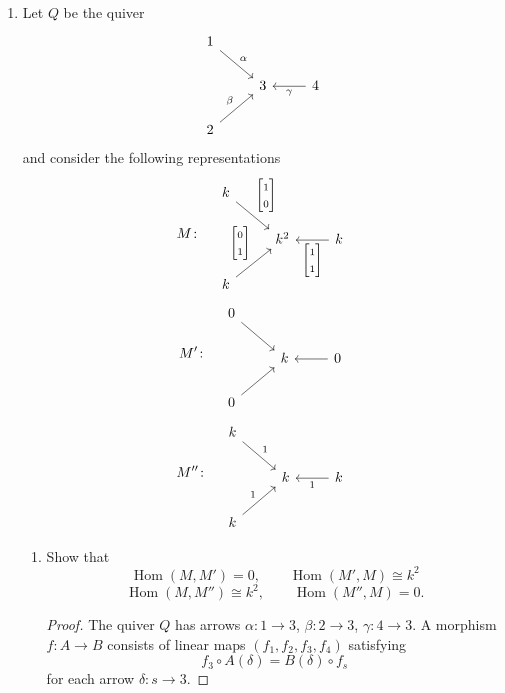 \documentclass[11pt, a4paper]{article}
\begin{document}
\begin{enumerate}[leftmargin=*, label=\textbf{\arabic*.}]
\item Let $Q$ be the quiver
\[
    \begin{tikzcd}
        1 \arrow[rd, "\alpha"] &   &                       \\
                               & 3 & 4 \arrow[l, "\gamma"] \\
        2 \arrow[ru, "\beta"]  &   &                      
        \end{tikzcd}
\]
and consider the following representations
\[
M\colon\quad
\begin{tikzcd}
    k \arrow[rd, "\begin{bmatrix} 1 \\ 0 \end{bmatrix}"] &     &                                                     \\
                                                         & k^2 & k \arrow[l, "\begin{bmatrix} 1 \\ 1 \end{bmatrix}"] \\
    k \arrow[ru, "\begin{bmatrix} 0 \\ 1 \end{bmatrix}"] &     &                                                    
    \end{tikzcd}
\]
\[
M'\colon\quad
\begin{tikzcd}
    0 \arrow[rd] &   &             \\
                 & k & 0 \arrow[l] \\
    0 \arrow[ru] &   &            
    \end{tikzcd}
\]  
\[
M''\colon\quad
\begin{tikzcd}
    k \arrow[rd, "1"] &   &                  \\
                      & k & k \arrow[l, "1"] \\
    k \arrow[ru, "1"] &   &                 
    \end{tikzcd}
\]
\begin{enumerate}[label=(\alph*)]
    \item Show that
    \[
        \operatorname{Hom}(M, M') = 0, \qquad \operatorname{Hom}(M', M) \cong k^2
    \]
    \[
        \operatorname{Hom}(M, M'') \cong k^2, \qquad \operatorname{Hom}(M'', M) = 0.
    \]
    \begin{proof}
    The quiver $Q$ has arrows $\alpha\colon 1\to 3$, $\beta\colon 2\to 3$, $\gamma\colon 4\to 3$. A morphism $f\colon A\to B$ consists of linear maps $(f_1,f_2,f_3,f_4)$ satisfying
    \[
    f_3\circ A(\delta) = B(\delta)\circ f_s
    \]
    for each arrow $\delta\colon s\to 3$.


\end{proof}
\end{enumerate}
\end{enumerate}
\end{document}
